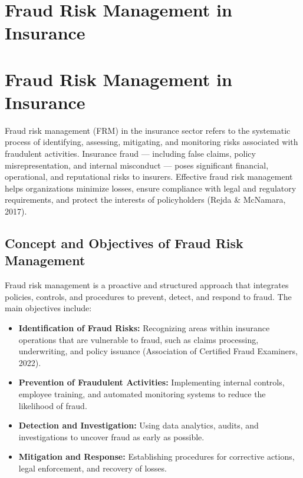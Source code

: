 \documentclass[12pt,a4paper]{article}
\begin{document}
\section*{Fraud Risk Management in Insurance}

\section{Fraud Risk Management in Insurance}

Fraud risk management (FRM) in the insurance sector refers to the systematic process of identifying, assessing, mitigating, and monitoring risks associated with fraudulent activities. Insurance fraud --- including false claims, policy misrepresentation, and internal misconduct --- poses significant financial, operational, and reputational risks to insurers. Effective fraud risk management helps organizations minimize losses, ensure compliance with legal and regulatory requirements, and protect the interests of policyholders (Rejda \& McNamara, 2017).

\subsection{Concept and Objectives of Fraud Risk Management}
Fraud risk management is a proactive and structured approach that integrates policies, controls, and procedures to prevent, detect, and respond to fraud. The main objectives include:

\begin{itemize}
    \item \textbf{Identification of Fraud Risks:} Recognizing areas within insurance operations that are vulnerable to fraud, such as claims processing, underwriting, and policy issuance (Association of Certified Fraud Examiners, 2022).
    \item \textbf{Prevention of Fraudulent Activities:} Implementing internal controls, employee training, and automated monitoring systems to reduce the likelihood of fraud.
    \item \textbf{Detection and Investigation:} Using data analytics, audits, and investigations to uncover fraud as early as possible.
    \item \textbf{Mitigation and Response:} Establishing procedures for corrective actions, legal enforcement, and recovery of losses.
\end{itemize}
\end{document}
